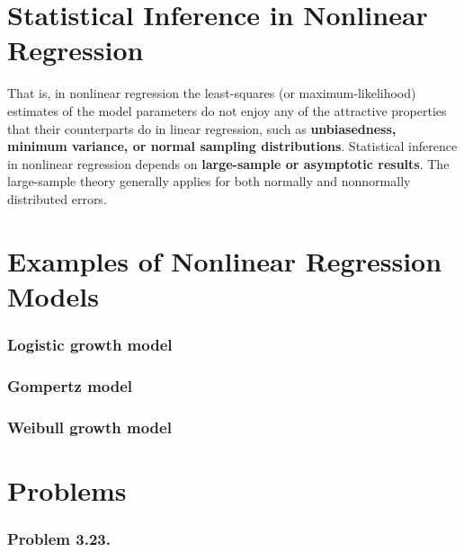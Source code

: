 \documentclass[12pt]{article}
\begin{document}
\section{Statistical Inference in Nonlinear Regression}

That is, in nonlinear regression the least-squares (or maximum-likelihood) estimates of the model parameters do not enjoy any of the attractive properties that their counterparts do in linear regression, such as \textbf{unbiasedness, minimum variance, or normal sampling distributions}. Statistical inference in nonlinear regression depends on \textbf{large-sample or asymptotic results}. The large-sample theory generally applies for both normally and nonnormally distributed errors.




\section{Examples of Nonlinear Regression Models}


\subsubsection*{Logistic growth model}


\subsubsection*{Gompertz model}


\subsubsection*{Weibull growth model}


\pagebreak

\section*{Problems}

\subsubsection*{Problem 3.23.}
\end{document}
